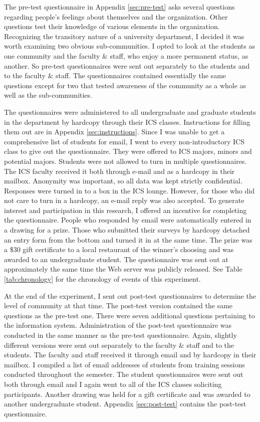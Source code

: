 The pre-test questionnaire in Appendix \ref{sec:pre-test} asks several
questions regarding people's feelings about themselves and the organization.
Other questions test their knowledge of various elements in the organization.
Recognizing the transitory nature of a university department, I decided it was
worth examining two obvious sub-communities.  I opted to look at the students
as one community and the faculty \& staff, who enjoy a more permanent status,
as another.  So pre-test questionnaires were sent out separately to the
students and to the faculty \& staff.  The questionnaires contained essentially
the same questions except for two that tested awareness of the community as a
whole as well as the sub-communities.

The questionnaires were administered to all undergraduate and graduate students
in the department by hardcopy through their ICS classes.  Instructions for
filling them out are in Appendix \ref{sec:instructions}.  Since I was unable to
get a comprehensive list of students for email, I went to every
non-introductory ICS class to give out the questionnaire.  They were offered to
ICS majors, minors and potential majors.  Students were not allowed to turn in
multiple questionnaires.  The ICS faculty received it both through e-mail and
as a hardcopy in their mailbox.  Anonymity was important, so all data was kept
strictly confidential.  Responses were turned in to a box in the ICS lounge.
However, for those who did not care to turn in a hardcopy, an e-mail reply was
also accepted.  To generate interest and participation in this research, I
offered an incentive for completing the questionnaire.  People who responded by
email were automatically entered in a drawing for a prize.  Those who submitted
their surveys by hardcopy detached an entry form from the bottom and turned it
in at the same time.  The prize was a \$30 gift certificate to a local
restaurant of the winner's choosing and was awarded to an undergraduate
student.  The questionnaire was sent out at approximately the same time the Web
server was publicly released.  See Table \ref{tab:chronology} for the
chronology of events of this experiment.

At the end of the experiment, I sent out post-test questionnaires to determine
the level of community at that time.  The post-test version contained the same
questions as the pre-test one.  There were seven additional questions
pertaining to the information system.  Administration of the post-test
questionnaire was conducted in the same manner as the pre-test questionnaire.
Again, slightly different versions were sent out separately to the faculty \&
staff and to the students.  The faculty and staff received it through email and
by hardcopy in their mailbox.  I compiled a list of email addresses of students
from training sessions conducted throughout the semester.  The student
questionnaires were sent out both through email and I again went to all of the
ICS classes soliciting participants.  Another drawing was held for a gift
certificate and was awarded to another undergraduate student.  Appendix
\ref{sec:post-test} contains the post-test questionnaire.

